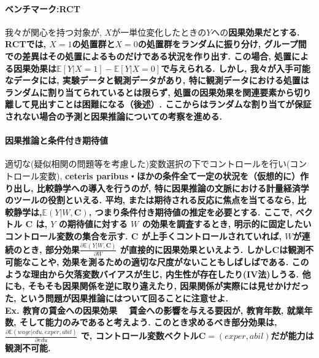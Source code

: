 \documentclass[paper=a4paper,fontsize=10pt]{jlreq}
\begin{document}
\paragraph{ベンチマーク:RCT}
我々が関心を持つ対象が, $X$が一単位変化したときの$Y$への\rmfamily\mcfamily\bfseries{因果効果}\mdseries だとする. RCTでは, $X=1$の処置群と$X=0$の処置群を\rmfamily\mcfamily\bfseries{ランダム}\mdseries に振り分け, グループ間での差異はその処置によるものだけである状況を作り出す. この場合, 処置による\rmfamily\mcfamily\bfseries{因果効果}\mdseries は$\mathbb{E}[Y|X=1]-\mathbb{E}[Y|X=0]$で与えられる. しかし, 我々が入手可能なデータには, 実験データと観測データがあり, 特に観測データにおける処置はランダムに割り当てられているとは限らず, 処置の因果効果を関連要素から切り離して見出すことは困難になる（後述）. ここからはランダムな割り当てが保証されない場合の予測と因果推論についての考察を進める. \\

\paragraph{因果推論と条件付き期待値}
適切な(疑似相関の問題等を考慮した)変数選択の下でコントロールを行い(\rightarrow コントロール変数), \rmfamily\mcfamily\bfseries{ceteris paribus・ほかの条件全て一定}\mdseries の状況を（仮想的に）作り出し, \rmfamily\mcfamily\bfseries{比較静学}\mdseries への導入を行うのが, 特に因果推論の文脈における計量経済学のツールの役割といえる. 平均, または期待される反応に焦点を当てるなら, 比較静学は,$\mathbb{E}(Y|W, \mathbf{C})$, つまり条件付き期待値の推定を必要とする. ここで, ベクトル $\mathbf{C}$ は, $Y$ の期待値に対する $W$ の効果を調査するとき, 明示的に\rmfamily\mcfamily\bfseries{固定したいコントロール変数の集合}\mdseries を示す. $\mathbf{C}$ が上手くコントロールされていれば, $W$が連続のとき, \rmfamily\mcfamily\bfseries{部分効果}\mdseries $\frac{\partial \mathbb{E}(Y|W, \mathbf{C})}{\partial W}$ が直接的に因果効果といえよう. しかし$\mathbf{C}$は観測不可能なことや, 効果を測るための適切な尺度がないこともしばしばである. このような理由から欠落変数バイアスが生じ, 内生性が存在したり(\rightarrow IV法)しうる. 他にも, そもそも因果関係を逆に取り違えたり, 因果関係が実際には見せかけだった, という問題が因果推論にはついて回ることに注意せよ.\\

\rmfamily\mcfamily\bfseries{Ex. 教育の賃金への因果効果}\mdseries　
賃金への影響を与える要因が, 教育年数, 就業年数, そして能力のみであると考えよう. このとき求めるべき部分効果は, $\frac{\partial \mathbb{E}(wage|edu, exper, abil)}{\partial edu}$ で, コントロール変数ベクトル$\mathbf{C}=(exper, abil)$だが能力は\rmfamily\mcfamily\bfseries{観測不可能}\mdseries . \\
\end{document}
